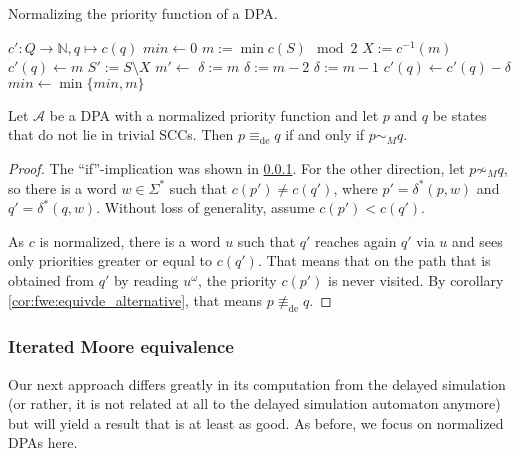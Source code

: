 \begin{algorithm}
  \caption{Normalizing the priority function of a DPA.}
  \label{alg:fwe:normalize_c}
  \begin{algorithmic}[1]
      \State $c' : Q \rightarrow \mathbb{N}, q \mapsto c(q)$
      \State {}
      \State {}
    \EndFunction
    \Statex
        \State {}
      \EndIf
      \State $min \gets 0$
        \State $m := \min c(S) \mod 2$
        \State $X := c^{-1}(m)$
          \State $c'(q) \gets m$
        \EndFor
        \State $S' := S \setminus X$
        \State $m' \gets $
            \State $\delta := m$
          \Else
            \State $\delta := m-2$
          \EndIf
        \Else
          \State $\delta := m-1$
        \EndIf
          \State $c'(q) \gets c'(q) - \delta$
        \EndFor
        \State $min \gets \min \{min, m\}$
      \EndFor
      \State {}
    \EndFunction
  \end{algorithmic}
\end{algorithm}


\begin{lem}
	Let $\mathcal{A}$ be a DPA with a normalized priority function and let $p$ and $q$ be states that do not lie in trivial SCCs. Then $p \equiv_\text{de} q$ if and only if $p \sim_M q$.
\end{lem}

\begin{proof}
	The \enquote{if}-implication was shown in \ref{}. For the other direction, let $p \not\sim_M q$, so there is a word $w \in \Sigma^*$ such that $c(p') \neq c(q')$, where $p' = \delta^*(p, w)$ and $q' = \delta^*(q, w)$. Without loss of generality, assume $c(p') < c(q')$.
	
	As $c$ is normalized, there is a word $u$ such that $q'$ reaches again $q'$ via $u$ and sees only priorities greater or equal to $c(q')$. That means that on the path that is obtained from $q'$ by reading $u^\omega$, the priority $c(p')$ is never visited. By corollary \ref{cor:fwe:equivde_alternative}, that means $p \not\equiv_\text{de} q$.
\end{proof}


\subsubsection{Iterated Moore equivalence}
Our next approach differs greatly in its computation from the delayed simulation (or rather, it is not related at all to the delayed simulation automaton anymore) but will yield a result that is at least as good. As before, we focus on normalized DPAs here.

